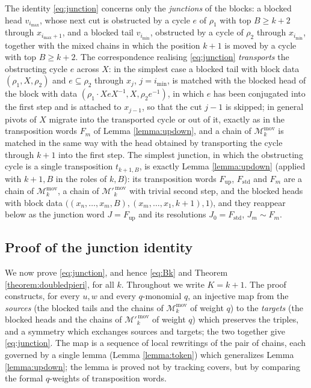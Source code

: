 \documentclass{amsart}
\theoremstyle{definition}
\theoremstyle{remark}
\numberwithin{equation}{section}
\begin{document}
The identity \eqref{eq:junction} concerns only the \emph{junctions} of the blocks: a blocked head $v_{i_{\max}}$, whose next cut is obstructed by a cycle $e$ of $\rho_1$ with top $B\geq k+2$ through $x_{i_{\max}+1}$, and a blocked tail $v_{i_{\min}}$, obstructed by a cycle of $\rho_2$ through $x_{i_{\min}}$, together with the mixed chains in which the position $k+1$ is moved by a cycle with top $B\geq k+2$. The correspondence realising \eqref{eq:junction} \emph{transports} the obstructing cycle $e$ across $X$: in the simplest case a blocked tail with block data $(\rho_1,X,\rho_2)$ and $e\subseteq\rho_2$ through $x_j$, $j=i_{\min}$, is matched with the blocked head of the block with data $(\rho_1\cdot XeX^{-1},X,\rho_2e^{-1})$, in which $e$ has been conjugated into the first step and is attached to $x_{j-1}$, so that the cut $j-1$ is skipped; in general pivots of $X$ migrate into the transported cycle or out of it, exactly as in the transposition words $F_m$ of Lemma \ref{lemma:updown}, and a chain of $\mathcal M_k^{\mathrm{mov}}$ is matched in the same way with the head obtained by transporting the cycle through $k+1$ into the first step. The simplest junction, in which the obstructing cycle is a single transposition $t_{k+1,B}$, is exactly Lemma \ref{lemma:updown} (applied with $k+1,B$ in the roles of $k,B$): its transposition words $F_{\mathrm{up}}$, $F_{\mathrm{std}}$ and $F_m$ are a chain of $\mathcal M_k^{\mathrm{mov}}$, a chain of $\mathcal M'^{\,\mathrm{mov}}_k$ with trivial second step, and the blocked heads with block data $\big((x_n,\ldots,x_m,B),(x_m,\ldots,x_1,k+1),1\big)$, and they reappear below as the junction word $J=F_{\mathrm{up}}$ and its resolutions $J_0=F_{\mathrm{std}}$, $J_m\sim F_m$.

\subsection*{Proof of the junction identity}

We now prove \eqref{eq:junction}, and hence \eqref{eq:Bk} and Theorem \ref{theorem:doubledpieri}, for all $k$. Throughout we write $K=k+1$. The proof constructs, for every $u,w$ and every $q$-monomial $q$, an injective map from the \emph{sources} (the blocked tails and the chains of $\mathcal M_k^{\mathrm{mov}}$ of weight $q$) to the \emph{targets} (the blocked heads and the chains of $\mathcal M'^{\,\mathrm{mov}}_k$ of weight $q$) which preserves the triples, and a symmetry which exchanges sources and targets; the two together give \eqref{eq:junction}. The map is a sequence of local rewritings of the pair of chains, each governed by a single lemma (Lemma \ref{lemma:token}) which generalizes Lemma \ref{lemma:updown}; the lemma is proved not by tracking covers, but by comparing the formal $q$-weights of transposition words.
\end{document}
